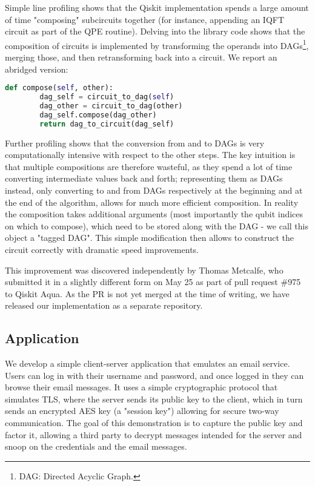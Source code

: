 \documentclass[conference]{IEEEtran}
\begin{document}
Simple line profiling shows that the Qiskit implementation spends a large amount of time "composing" subcircuits together (for instance, appending an IQFT circuit as part of the QPE routine). Delving into the library code shows that the composition of circuits is implemented by transforming the operands into DAGs\footnote{DAG: Directed Acyclic Graph.}, merging those, and then retransforming back into a circuit. We report an abridged version:

\lstset{basicstyle=\ttfamily\footnotesize,breaklines=true}
\begin{lstlisting}[language=Python]
def compose(self, other):
        dag_self = circuit_to_dag(self)
        dag_other = circuit_to_dag(other)
        dag_self.compose(dag_other)
        return dag_to_circuit(dag_self)
\end{lstlisting}

Further profiling shows that the conversion from and to DAGs is very computationally intensive with respect to the other steps. The key intuition is that multiple compositions are therefore wasteful, as they spend a lot of time converting intermediate values back and forth; representing them as DAGs instead, only converting to and from DAGs respectively at the beginning and at the end of the algorithm, allows for much more efficient composition. In reality the composition takes additional arguments (most importantly the qubit indices on which to compose), which need to be stored along with the DAG - we call this object a "tagged DAG". This simple modification then allows to construct the circuit correctly with dramatic speed improvements.

This improvement was discovered independently by Thomas Metcalfe, who submitted it in a slightly different form on May 25 as part of pull request \#975 to Qiskit Aqua. As the PR is not yet merged at the time of writing, we have released our implementation \cite{github-repo} as a separate repository.

\subsection{Application}
We develop a simple client-server application that emulates an email service. Users can log in with their username and password, and once logged in they can browse their email messages. It uses a simple cryptographic protocol that simulates TLS, where the server sends its public key to the client, which in turn sends an encrypted AES key (a "session key") allowing for secure two-way communication. The goal of this demonstration is to capture the public key and factor it, allowing a third party to decrypt messages intended for the server and snoop on the credentials and the email messages.
\end{document}

